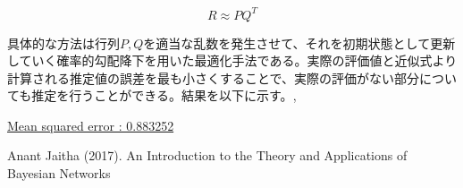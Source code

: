 \documentclass[a4j,12pt]{jarticle}
\begin{document}
$$ R \approx P  Q^T$$

具体的な方法は行列$P,Q$を適当な乱数を発生させて、それを初期状態として更新していく確率的勾配降下を用いた最適化手法である。実際の評価値と近似式より計算される推定値の誤差を最も小さくすることで、実際の評価がない部分についても推定を行うことができる。結果を以下に示す。\cite{Kamo00}\cite{藤田12},

\underline{Mean squared error :  0.883252}


\begin{thebibliography}{5}
\bibitem{}  Anant Jaitha (2017). An Introduction to the Theory and Applications of Bayesian Networks 
\end{thebibliography}



\end{document}

